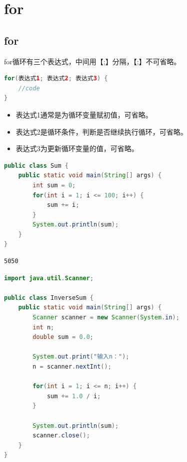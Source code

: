 \section{for}

\subsection{for}

for循环有三个表达式，中间用【;】分隔，【;】不可省略。

\vspace{-0.5cm}

\begin{lstlisting}[language=Java]
for(表达式1; 表达式2; 表达式3) {
    //code
}
\end{lstlisting}

\begin{itemize}
    \item 表达式1通常是为循环变量赋初值，可省略。
    \item 表达式2是循环条件，判断是否继续执行循环，可省略。
    \item 表达式3为更新循环变量的值，可省略。
\end{itemize}

\vspace{0.5cm}


\begin{lstlisting}[language=Java]
public class Sum {
    public static void main(String[] args) {
        int sum = 0;
        for(int i = 1; i <= 100; i++) {
            sum += i;
        }
        System.out.println(sum);
    }
}
\end{lstlisting}

\begin{tcolorbox}
    \begin{verbatim}
5050
\end{verbatim}
\end{tcolorbox}

\vspace{0.5cm}


\begin{lstlisting}[language=Java]
import java.util.Scanner;

public class InverseSum {
    public static void main(String[] args) {
        Scanner scanner = new Scanner(System.in);
        int n;
        double sum = 0.0;
        
        System.out.print("输入n：");
        n = scanner.nextInt();
        
        for(int i = 1; i <= n; i++) {
            sum += 1.0 / i;
        }
        
        System.out.println(sum);
        scanner.close();
    }
}
\end{lstlisting}

